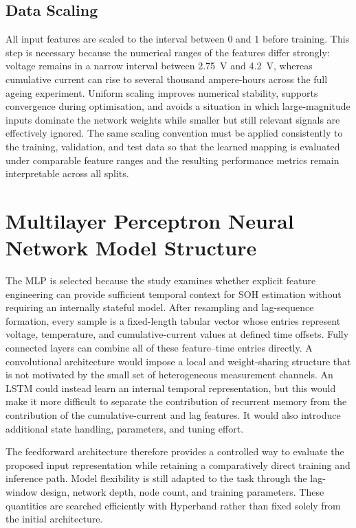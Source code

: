 \documentclass[
    a4paper,
    12pt,
    titlepage,
    bibliography=totoc,
    twoside=on,
    parskip=false,
    numbers=noenddot,
    cleardoublepage=empty,
    DIV=12,
    BCOR=12.0mm,
    headheight=36pt,
    headings=openright
]{scrreprt}
\begin{document}
\subsection{Data Scaling}
All input features are scaled to the interval between 0 and 1 before training.\autocite{salimansWeightNormalizationSimple2016} This step is necessary because the numerical ranges of the features differ strongly: voltage remains in a narrow interval between \SI{2.75}{\volt} and \SI{4.2}{\volt}, whereas cumulative current can rise to several thousand ampere-hours across the full ageing experiment. Uniform scaling improves numerical stability, supports convergence during optimisation, and avoids a situation in which large-magnitude inputs dominate the network weights while smaller but still relevant signals are effectively ignored.\autocite{salimansWeightNormalizationSimple2016} The same scaling convention must be applied consistently to the training, validation, and test data so that the learned mapping is evaluated under comparable feature ranges and the resulting performance metrics remain interpretable across all splits.

\section{Multilayer Perceptron Neural Network Model Structure}
The MLP is selected because the study examines whether explicit feature engineering can provide sufficient temporal context for SOH estimation without requiring an internally stateful model. After resampling and lag-sequence formation, every sample is a fixed-length tabular vector whose entries represent voltage, temperature, and cumulative-current values at defined time offsets. Fully connected layers can combine all of these feature--time entries directly. A convolutional architecture would impose a local and weight-sharing structure that is not motivated by the small set of heterogeneous measurement channels. An LSTM could instead learn an internal temporal representation, but this would make it more difficult to separate the contribution of recurrent memory from the contribution of the cumulative-current and lag features. It would also introduce additional state handling, parameters, and tuning effort.\autocite{weytjensCashFlowPrediction2021}

The feedforward architecture therefore provides a controlled way to evaluate the proposed input representation while retaining a comparatively direct training and inference path. Model flexibility is still adapted to the task through the lag-window design, network depth, node count, and training parameters. These quantities are searched efficiently with Hyperband rather than fixed solely from the initial architecture.\autocite{liHyperbandNovelBanditBased2016}
\end{document}
